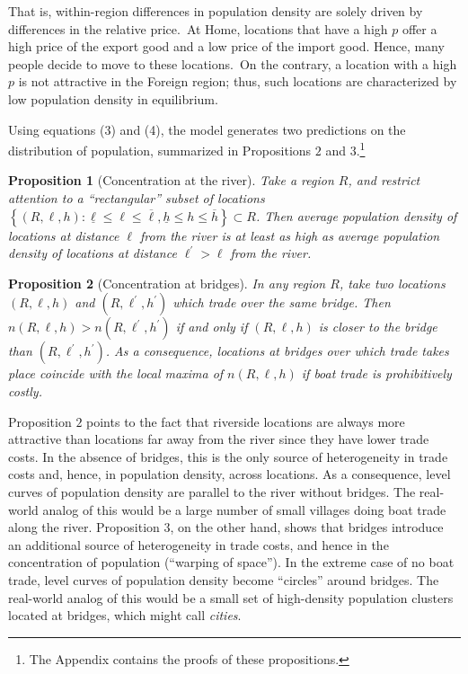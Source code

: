 \documentclass[12pt]{article}
\newtheorem{proposition}{Proposition}
\begin{document}
That is, within-region differences in population density are solely
driven by differences in the relative price.\ At Home, locations that have a
high $p$ offer a high price of the export good and a low price of the import
good. Hence, many people decide to move to these locations.\ On the
contrary, a location with a high $p$ is not attractive in the Foreign
region; thus, such locations are characterized by low population density in
equilibrium.

Using equations (3) and (4), the model generates two predictions on the
distribution of population, summarized in Propositions $2$ and $3$.\footnote{%
The Appendix contains the proofs of these propositions.}

\begin{proposition}[Concentration at the river]
Take a region $R$, and restrict attention to a ``rectangular'' subset of
locations $\left \{ \left( R,\ell ,h\right) :\underline{\ell }\leq \ell \leq 
\overline{\ell },\underline{h}\leq h\leq \overline{h}\right \} \subset R$.
Then average population density of locations at distance $\ell $ from the
river is at least as high as average population density of locations at
distance $\ell ^{\prime }>\ell $ from the river.
\end{proposition}

\begin{proposition}[Concentration at bridges]
In any region $R$, take two locations $\left( R,\ell ,h\right) $ and $%
\left( R,\ell ^{\prime },h^{\prime }\right) $ which trade over the same
bridge. Then $n\left( R,\ell ,h\right) >n\left( R,\ell ^{\prime },h^{\prime
}\right) $ if and only if $\left( R,\ell ,h\right) $ is closer to the bridge
than $\left( R,\ell ^{\prime },h^{\prime }\right) $. As a consequence,
locations at bridges over which trade takes place coincide with the local maxima
of $n\left( R,\ell ,h\right) $ if boat trade is prohibitively costly.
\end{proposition}

Proposition $2$ points to the fact that riverside locations are always more 
attractive than locations far away from the river since they have lower trade 
costs. In the absence of bridges, this is the only source of heterogeneity in trade costs 
and, hence, in population density, across locations. As a consequence, level 
curves of population density are parallel to the river without bridges. The real-world 
analog of this would be a large number of small villages doing boat trade 
along the river. Proposition $3$, on the other hand, shows that bridges introduce 
an additional source of heterogeneity in trade costs, and hence in the 
concentration of population (``warping of space''). In the extreme case of no 
boat trade, level curves of population density become ``circles'' around bridges. 
The real-world analog of this would be a small set of high-density population clusters 
located at bridges, which might call \textit{cities}.
\end{document}

